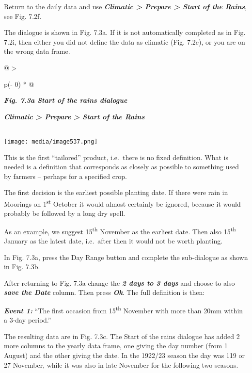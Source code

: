 \documentclass[
  letterpaper,
  DIV=11,
  numbers=noendperiod]{scrreprt}
\begin{document}
Return to the daily data and use \textbf{\emph{Climatic \textgreater{}
Prepare \textgreater{} Start of the Rains}}, see Fig. 7.2f.

The dialogue is shown in Fig. 7.3a. If it is not automatically completed
as in Fig. 7.2i, then either you did not define the data as climatic
(Fig. 7.2e), or you are on the wrong data frame.

\begin{longtable}[]{@{}
  >{\raggedright\arraybackslash}p{(\columnwidth - 0\tabcolsep) * }@{}}
\toprule\noalign{}
\begin{minipage}[b]{\linewidth}\raggedright
\textbf{\emph{Fig. 7.3a Start of the rains dialogue}}

\textbf{\emph{Climatic \textgreater{} Prepare \textgreater{} Start of
the Rains}}
\end{minipage} \\
\midrule\noalign{}
\endhead
\bottomrule\noalign{}
\endlastfoot
\texttt{[image: media/image537.png]} \\
\end{longtable}

This is the first ``tailored'' product, i.e.~there is no fixed
definition. What is needed is a definition that corresponds as closely
as possible to something used by farmers -- perhaps for a specified
crop.

The first decision is the earliest possible planting date. If there were
rain in Moorings on 1\textsuperscript{st} October it would almost
certainly be ignored, because it would probably be followed by a long
dry spell.

As an example, we suggest 15\textsuperscript{th} November as the
earliest date. Then also 15\textsuperscript{th} January as the latest
date, i.e.~after then it would not be worth planting.

In Fig. 7.3a, press the Day Range button and complete the sub-dialogue
as shown in Fig. 7.3b.

After returning to Fig. 7.3a change the \textbf{\emph{2 days to 3 days}}
and choose to also \textbf{\emph{save the Date}} column. Then press
\textbf{\emph{Ok}}. The full definition is then:

\textbf{\emph{Event 1:}} ``The first occasion from
15\textsuperscript{th} November with more than 20mm within a 3-day
period.''

The resulting data are in Fig. 7.3c. The Start of the rains dialogue has
added 2 more columns to the yearly data frame, one giving the day number
(from 1 August) and the other giving the date. In the 1922/23 season the
day was 119 or 27 November, while it was also in late November for the
following two seasons.
\end{document}
